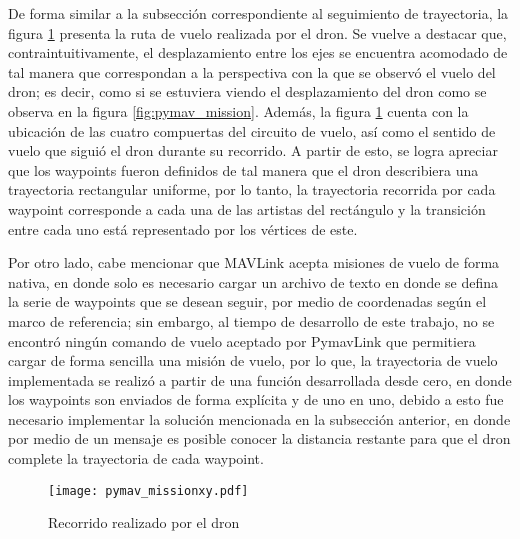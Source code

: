 De forma similar a la subsección correspondiente al seguimiento de trayectoria, la figura \ref{fig:pymav_missionxy} presenta la ruta de vuelo realizada por el dron. Se vuelve a destacar que, contraintuitivamente, el desplazamiento entre los ejes se encuentra acomodado de tal manera que correspondan a la perspectiva con la que se observó el vuelo del dron; es decir, como si se estuviera viendo el desplazamiento del dron como se observa en la figura \ref{fig:pymav_mission}. Además, la figura \ref{fig:pymav_missionxy} cuenta con la ubicación de las cuatro compuertas del circuito de vuelo, así como el sentido de vuelo que siguió el dron durante su recorrido. A partir de esto, se logra apreciar que los waypoints fueron definidos de tal manera que el dron describiera una trayectoria rectangular uniforme, por lo tanto, la trayectoria recorrida por cada waypoint corresponde a cada una de las artistas del rectángulo y la transición entre cada uno está representado por los vértices de este. 

Por otro lado, cabe mencionar que MAVLink acepta misiones de vuelo de forma nativa, en donde solo es necesario cargar un archivo de texto en donde se defina la serie de waypoints que se desean seguir, por medio de coordenadas según el marco de referencia; sin embargo, al tiempo de desarrollo de este trabajo, no se encontró ningún comando de vuelo aceptado por PymavLink que permitiera cargar de forma sencilla una misión de vuelo, por lo que, la trayectoria de vuelo implementada se realizó a partir de una función desarrollada desde cero, en donde los waypoints son enviados de forma explícita y de uno en uno, debido a esto fue necesario implementar la solución mencionada en la subsección anterior, en donde por medio de un mensaje es posible conocer la distancia restante para que el dron complete la trayectoria de cada waypoint.

\begin{figure}[ht]
    \centering
    \texttt{[image: pymav\_missionxy.pdf]}
    \caption{Recorrido realizado por el dron}
    \label{fig:pymav_missionxy}
\end{figure}

